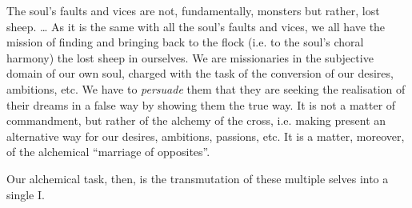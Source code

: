 \begin{quotationx}
The soul's faults and vices are not, fundamentally, monsters but rather, lost sheep. … As it is the
same with all the soul's faults and vices, we all have the mission of finding and bringing back to
the flock (i.e. to the soul's choral harmony) the lost sheep in ourselves. We are missionaries in
the subjective domain of our own soul, charged with the task of the conversion of our desires, ambitions, etc. We have
to \emph{persuade }them that they are seeking the realisation of their dreams in a false way by showing them the true
way. It is not a matter of commandment, but rather of the alchemy of the cross, i.e. making present an alternative way
for our desires, ambitions, passions, etc. It is a matter, moreover, of the alchemical “marriage of opposites”. 

\end{quotationx}
Our alchemical task, then, is the transmutation of these multiple selves into a single I.

